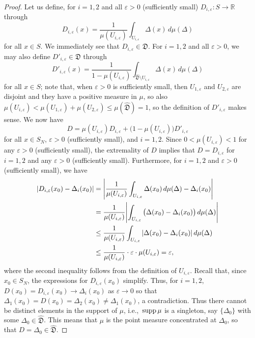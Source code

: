 \documentclass[12pt,a4paper,reqno]{amsart}
\theoremstyle{definition}
\newcommand{\mf}[1]{\mathfrak{#1}}
\newcommand{\R}{\mathbb R}
\let\originalleft\left
\let\originalright\right
\renewcommand{\left}{\mathopen{}\mathclose\bgroup\originalleft}
\renewcommand{\right}{\aftergroup\egroup\originalright}
\begin{document}
\begin{proof}
Let us define, for $i=1,2$ and all $\varepsilon>0$ (sufficiently small) $D_{i,\varepsilon}:S\to\R$ through
$$
D_{i,\varepsilon}(x)=\frac{1}{\mu(U_{i,\varepsilon})}\int_{U_{i,\varepsilon}}\Delta(x)\,d\mu(\Delta)
$$
for all $x\in S$. We immediately see that $D_{i,\varepsilon}\in\mf D$. For $i=1,2$ and all $\varepsilon>0$, we may also define $D'_{i,\varepsilon}\in\mf D$ through
$$
D'_{i,\varepsilon}(x)=\frac{1}{1-\mu(U_{i,\varepsilon})}\int_{\hat{\mf D}\setminus U_{i,\varepsilon}}\Delta(x)\,d\mu(\Delta)
$$
for all $x\in S$; note that, when $\varepsilon>0$ is sufficiently small, then $U_{1,\varepsilon}$ and $U_{2,\varepsilon}$ are disjoint and they have a positive measure in $\mu$, so also $\mu(U_{i,\varepsilon})<\mu(U_{1,\varepsilon})+\mu(U_{2,\varepsilon})\leq\mu(\hat{\mf D})=1$, so the definition of $D'_{i,\varepsilon}$ makes sense. We now have
$$
D=\mu(U_{i,\varepsilon})D_{i,\varepsilon}+\big(1-\mu(U_{i,\varepsilon})\big)D'_{i,\varepsilon}
$$
for all $x\in S_N$, $\varepsilon>0$ (sufficiently small), and $i=1,2$. Since $0<\mu(U_{i,\varepsilon})<1$ for any $\varepsilon>0$ (sufficiently small), the extremality of $D$ implies that $D=D_{i,\varepsilon}$ for $i=1,2$ and any $\varepsilon>0$ (sufficiently small). Furthermore, for $i=1,2$ and $\varepsilon>0$ (sufficiently small), we have
\begin{align*}
|D_{i,\varepsilon}(x_0)-\Delta_i(x_0)|&=\left|\frac{1}{\mu(U_{i,\varepsilon})}\int_{U_{i,\varepsilon}}\Delta(x_0)\,d\mu(\Delta)-\Delta_i(x_0)\right|\\
&=\frac{1}{\mu(U_{i,\varepsilon})}\left|\int_{U_{i,\varepsilon}}\big(\Delta(x_0)-\Delta_i(x_0)\big)\,d\mu(\Delta)\right|\\
&\leq\frac{1}{\mu(U_{i,\varepsilon})}\int_{U_{i,\varepsilon}}|\Delta(x_0)-\Delta_i(x_0)|\,d\mu(\Delta)\\
&\leq\frac{1}{\mu(U_{i,\varepsilon})}\cdot\varepsilon\cdot\mu(U_{i,\varepsilon})=\varepsilon,
\end{align*}
where the second inequality follows from the definition of $U_{i,\varepsilon}$. Recall that, since $x_0\in S_N$, the expressions for $D_{i,\varepsilon}(x_0)$ simplify. Thus, for $i=1,2$, $D(x_0)=D_{i,\varepsilon}(x_0)\to\Delta_i(x_0)$ as $\varepsilon\to 0$ so that $\Delta_1(x_0)=D(x_0)=\Delta_2(x_0)\neq\Delta_1(x_0)$, a contradiction. Thus there cannot be distinct elements in the support of $\mu$, i.e.,\ ${\rm supp}\,\mu$ is a singleton, say $\{\Delta_0\}$ with some $\Delta_0\in\hat{\mf D}$. This means that $\mu$ is the point measure concentrated at $\Delta_0$, so that $D=\Delta_0\in\hat{\mf D}$.
\end{proof}
\end{document}
